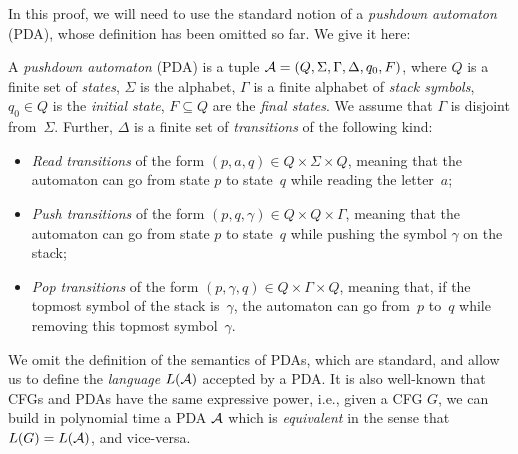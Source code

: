 In this proof, we will need to use the standard notion of a \emph{pushdown
automaton} (PDA), whose definition has been omitted so far.
We give it here:

\begin{definition}
  \label{gram:def:pda}
  A \emph{pushdown automaton} (PDA) is a tuple $\mathcal{A} = (Q, \Sigma, \Gamma, \Delta,
  q_0, F)$, where $Q$ is a finite set of \emph{states}, $\Sigma$ is the
  alphabet, $\Gamma$ is a finite alphabet of \emph{stack symbols}, $q_0 \in Q$
  is the \emph{initial state}, $F \subseteq Q$ are the \emph{final states}. We
  assume that $\Gamma$ is disjoint from~$\Sigma$. Further, $\Delta$ is a finite
  set of \emph{transitions} of the following kind:
  \begin{itemize}
    \item \emph{Read transitions} of the form $(p, a, q) \in Q \times \Sigma
      \times Q$, meaning that the automaton can go from state $p$ to
      state~$q$ while reading the letter~$a$;
    \item \emph{Push transitions} of the form $(p, q, \gamma) \in Q \times Q
      \times \Gamma$, meaning that the automaton can go from state $p$ to
      state~$q$ while pushing the symbol $\gamma$ on the stack;
    \item \emph{Pop transitions} of the form $(p, \gamma, q) \in Q \times \Gamma
      \times Q$, meaning that, if the topmost symbol of the stack is~$\gamma$,
      the automaton can go from~$p$ to~$q$ while removing this topmost
      symbol~$\gamma$.
  \end{itemize}
\end{definition}

We omit the definition of the semantics of PDAs, which are standard, and allow
us to define the \emph{language} $L(\mathcal{A})$ accepted by a PDA. It is also well-known
that CFGs and PDAs have the same expressive power, i.e., given a CFG $G$, we can
build in polynomial time a PDA $\mathcal{A}$ which is \emph{equivalent} in the sense that
$L(G) = L(\mathcal{A})$, and vice-versa.

%

